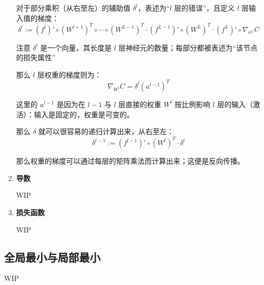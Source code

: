 \documentclass[../studies-ml.tex]{subfiles}
\begin{document}
\begin{enumerate}[I]
        对于部分乘积（从右至左）的辅助值 $\delta^l$，表述为“$l$ 层的错误”，且定义 $l$ 层输入值的梯度：
        \[
          \delta^l := (f^l)' \circ (W^{l+1})^T \circ \cdots \circ (W^{L-1})^T \cdot (f^{L-1})' \circ (W^L)^T
          \cdot (f^L)' \circ \nabla_{a^L} C
        \]

        注意 $\delta^l$ 是一个向量，其长度是 $l$ 层神经元的数量；每部分都被表述为“该节点的损失属性”

        那么 $l$ 层权重的梯度则为：
        \[ \nabla_{W^l} C = \delta^l (a^{l-1})^T \]

        这里的 $a^{l-1}$ 是因为在 $l-1$ 与 $l$ 层直接的权重 $W^l$ 按比例影响 $l$ 层的输入（激活）：输入是固定的，权重是可变的。

        那么 $\delta$ 就可以很容易的递归计算出来，从右至左：
        \[ \delta^{l-1} := (f^{l-1})' \circ (W^l)^T \cdot \delta^l \]

        那么权重的梯度可以通过每层的矩阵乘法而计算出来；这便是反向传播。

  \item \textbf{导数}

        WIP

  \item \textbf{损失函数}

        WIP

\end{enumerate}

\newpage
\subsection{全局最小与局部最小}

WIP
\end{document}
